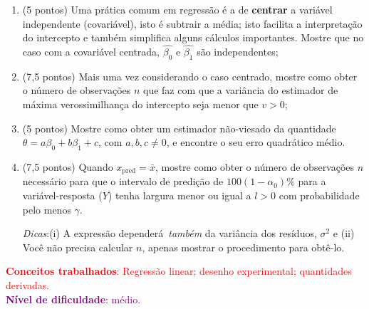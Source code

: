 \documentclass[a4paper,10pt, notitlepage]{report}
\begin{document}
\begin{enumerate}[label=\alph*)]
 \item (5 pontos) Uma prática comum em regressão é a de \textbf{centrar} a variável independente (covariável), isto é subtrair a média; isto facilita a interpretação do intercepto e também simplifica alguns cálculos importantes.
 Mostre que no caso com a covariável centrada, $\hat{\beta_0}$ e $\hat{\beta_1}$ são independentes;
 \item (7,5 pontos) Mais uma vez considerando o caso centrado, mostre 
 como obter o número de observações $n$ que faz com que a variância do estimador de máxima verossimilhança do intercepto seja menor que $v > 0$;
 \item (5 pontos) Mostre como obter um estimador não-viesado da quantidade $\theta = a\beta_0 + b\beta_1 + c$, com $a, b, c \neq 0$, e encontre o seu erro quadrático médio.
 \item (7,5 pontos)  Quando $x_{\text{pred}} = \bar{x}$, mostre como obter  o número de observações $n$ necessário para que o intervalo de predição de $100(1-\alpha_0)\%$ para a variável-resposta ($Y$) tenha largura menor ou igual a $l>0$ com probabilidade pelo menos $\gamma$.
 
 \textit{Dicas}:(i) A expressão dependerá~\textit{também} da variância dos resíduos, $\sigma^2$ e (ii) Você não precisa calcular $n$, apenas mostrar o procedimento para obtê-lo.
 
 \end{enumerate}
\textcolor{red}{\textbf{Conceitos trabalhados}: Regressão linear; desenho experimental; quantidades derivadas.}\\ \textcolor{purple}{\textbf{Nível de dificuldade}: médio.}\\
\end{document}
